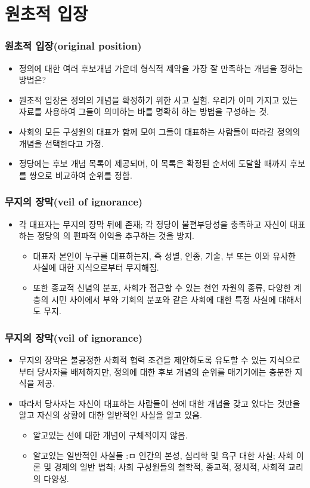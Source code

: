 \documentclass[aspectratio=169,xcolor=dvipsnames,handout]{beamer}
\begin{document}
\section{원초적 입장}
\begin{frame}[<+->]
\frametitle{원초적 입장(original position)}
    \begin{itemize}
        \item 정의에 대한 여러 후보개념 가운데 형식적 제약을 가장 잘 만족하는 개념을 정하는 방법은?
        \item 원초적 입장은 정의의 개념을 확정하기 위한 사고 실험. 우리가 이미 가지고 있는 자료를 사용하여 그들이 의미하는 바를 명확히 하는 방법을 구성하는 것.
        \item 사회의 모든 구성원의 대표가 함께 모여 그들이 대표하는 사람들이 따라갈 정의의 개념을 선택한다고 가정.
        \item 정당에는 후보 개념 목록이 제공되며, 이 목록은 확정된 순서에 도달할 때까지 후보를 쌍으로 비교하여 순위를 정함.
    \end{itemize}
\end{frame}


\begin{frame}[<+->]
\frametitle{무지의 장막(veil of ignorance)}
    \begin{itemize}
        \item 각 대표자는 무지의 장막 뒤에 존재; 각 정당이 불편부당성을 충족하고 자신이 대표하는 정당의 의 편파적 이익을 추구하는 것을 방지.
        \begin{itemize}
            \item 대표자 본인이 누구를 대표하는지, 즉 성별, 인종, 기술, 부 또는 이와 유사한 사실에 대한 지식으로부터 무지해짐.
            \item 또한 종교적 신념의 분포, 사회가 접근할 수 있는 천연 자원의 종류, 다양한 계층의 시민 사이에서 부와 기회의 분포와 같은 사회에 대한 특정 사실에 대해서도 무지.
        \end{itemize}
    \end{itemize}
\end{frame}

\begin{frame}[<+->]
\frametitle{무지의 장막(veil of ignorance)}
    \begin{itemize}
        \item 무지의 장막은 불공정한 사회적 협력 조건을 제안하도록 유도할 수 있는 지식으로부터 당사자를 배제하지만, 정의에 대한 후보 개념의 순위를 매기기에는 충분한 지식을 제공.
        \item 따라서 당사자는 자신이 대표하는 사람들이 선에 대한 개념을 갖고 있다는 것만을 알고 자신의 상황에 대한 일반적인 사실을 알고 있음.
        \begin{itemize}
            \item 알고있는 선에 대한 개념이 구체적이지 않음.
            \item 알고있는 일반적인 사실들 :ㅁ 인간의 본성, 심리학 및 욕구 대한 사실; 사회 이론 및 경제의 일반 법칙; 사회 구성원들의 철학적, 종교적, 정치적, 사회적 교리의 다양성.
        \end{itemize}
    \end{itemize}
\end{frame}
\end{document}
